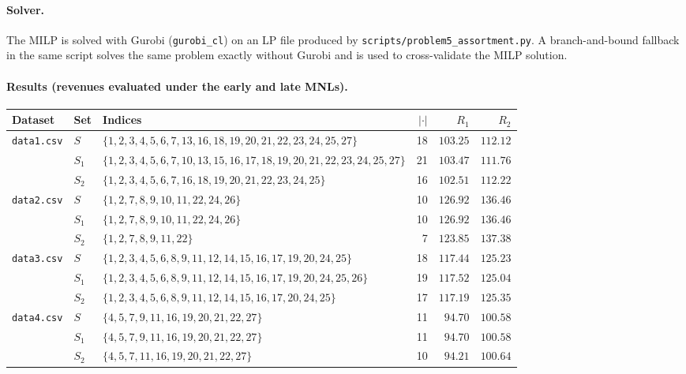 \documentclass[11pt]{article}
\begin{document}
\paragraph{Solver.}
The MILP is solved with Gurobi (\texttt{gurobi\_cl}) on an LP file produced
by \texttt{scripts/problem5\_assortment.py}. A branch-and-bound fallback in
the same script solves the same problem exactly without Gurobi and is used
to cross-validate the MILP solution.

\paragraph{Results (revenues evaluated under the early and late MNLs).}
\begin{center}
\begin{tabular}{lllrrr}
\toprule
Dataset & Set & Indices & $|\cdot|$ & $R_1$ & $R_2$ \\
\midrule
\multirow{3}{*}{\texttt{data1.csv}}
 & $S$   & $\{1,2,3,4,5,6,7,13,16,18,19,20,21,22,23,24,25,27\}$         & 18 & $103.25$ & $112.12$ \\
 & $S_1$ & $\{1,2,3,4,5,6,7,10,13,15,16,17,18,19,20,21,22,23,24,25,27\}$ & 21 & $103.47$ & $111.76$ \\
 & $S_2$ & $\{1,2,3,4,5,6,7,16,18,19,20,21,22,23,24,25\}$                & 16 & $102.51$ & $112.22$ \\
\midrule
\multirow{3}{*}{\texttt{data2.csv}}
 & $S$   & $\{1,2,7,8,9,10,11,22,24,26\}$ & 10 & $126.92$ & $136.46$ \\
 & $S_1$ & $\{1,2,7,8,9,10,11,22,24,26\}$ & 10 & $126.92$ & $136.46$ \\
 & $S_2$ & $\{1,2,7,8,9,11,22\}$           &  7 & $123.85$ & $137.38$ \\
\midrule
\multirow{3}{*}{\texttt{data3.csv}}
 & $S$   & $\{1,2,3,4,5,6,8,9,11,12,14,15,16,17,19,20,24,25\}$    & 18 & $117.44$ & $125.23$ \\
 & $S_1$ & $\{1,2,3,4,5,6,8,9,11,12,14,15,16,17,19,20,24,25,26\}$ & 19 & $117.52$ & $125.04$ \\
 & $S_2$ & $\{1,2,3,4,5,6,8,9,11,12,14,15,16,17,20,24,25\}$       & 17 & $117.19$ & $125.35$ \\
\midrule
\multirow{3}{*}{\texttt{data4.csv}}
 & $S$   & $\{4,5,7,9,11,16,19,20,21,22,27\}$ & 11 & $94.70$ & $100.58$ \\
 & $S_1$ & $\{4,5,7,9,11,16,19,20,21,22,27\}$ & 11 & $94.70$ & $100.58$ \\
 & $S_2$ & $\{4,5,7,11,16,19,20,21,22,27\}$   & 10 & $94.21$ & $100.64$ \\
\bottomrule
\end{tabular}
\end{center}
\end{document}
